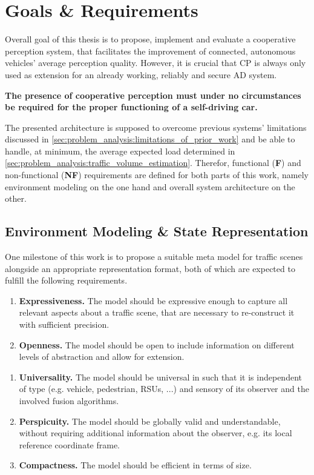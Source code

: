 \section{Goals \& Requirements}
\label{sec:problem_analysis:goals_requirements}
Overall goal of this thesis is to propose, implement and evaluate a cooperative perception system, that facilitates the improvement of connected, autonomous vehicles' average perception quality. However, it is crucial that CP is always only used as extension for an already working, reliably and secure AD system. 
\par
\medskip

\textbf{The presence of cooperative perception must under no circumstances be required for the proper functioning of a self-driving car.}
\par
\medskip

The presented architecture is supposed to overcome previous systems' limitations discussed in \cref{sec:problem_analysis:limitations_of_prior_work} and be able to handle, at minimum, the average expected load determined in \cref{sec:problem_analysis:traffic_volume_estimation}. Therefor, functional (\textbf{F}) and non-functional (\textbf{NF}) requirements are defined for both parts of this work, namely environment modeling on the one hand and overall system architecture on the other.

\subsection{Environment Modeling \& State Representation}
\label{subsec:problem_analysis:environment_modeling_state_representation}

One milestone of this work is to propose a suitable meta model for traffic scenes alongside an appropriate representation format, both of which are expected to fulfill the following requirements. 

\begin{enumerate}[F-M1:\ \ ]
	\item \textbf{Expressiveness.} The model should be expressive enough to capture all relevant aspects about a traffic scene, that are necessary to re-construct it with sufficient precision.
	\item \textbf{Openness.} The model should be open to include information on different levels of abstraction and allow for extension.
\end{enumerate}
\begin{enumerate}[NF-M1:]
	\item \textbf{Universality.} The model should be universal in such that it is independent of type (e.g. vehicle, pedestrian, RSUs, ...) and sensory of its observer and the involved fusion algorithms.
	\item \textbf{Perspicuity.} The model should be globally valid and understandable, without requiring additional information about the observer, e.g. its local reference coordinate frame. 
	\item \textbf{Compactness.} The model should be efficient in terms of size.
\end{enumerate}

